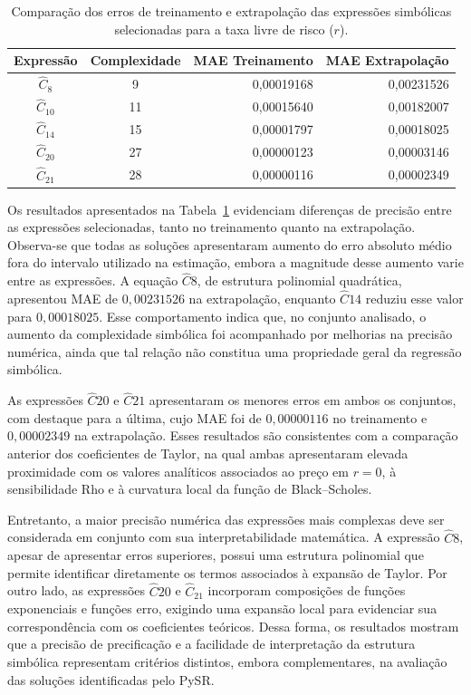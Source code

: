 \begin{table}[htbp]
\centering
\caption{Comparação dos erros de treinamento e extrapolação
das expressões simbólicas selecionadas para a taxa livre
de risco ($r$).}
\label{tab:r_metricas}
\small
\setlength{\tabcolsep}{10pt}
\renewcommand{\arraystretch}{1.2}

\begin{tabular}{c c r r}
\hline
\textbf{Expressão} &
\textbf{Complexidade} &
\textbf{MAE Treinamento} &
\textbf{MAE Extrapolação} \\
\hline

$\widehat{C}_8$  & 9  & 0,00019168 & 0,00231526 \\
$\widehat{C}_{10}$ & 11 & 0,00015640 & 0,00182007 \\
$\widehat{C}_{14}$ & 15 & 0,00001797 & 0,00018025 \\
$\widehat{C}_{20}$ & 27 & 0,00000123 & 0,00003146 \\
$\widehat{C}_{21}$ & 28 & 0,00000116 & 0,00002349 \\

\hline
\end{tabular}
\end{table}

Os resultados apresentados na Tabela~\ref{tab:r_metricas} evidenciam diferenças de precisão entre as expressões selecionadas, tanto no treinamento quanto na extrapolação. Observa-se que todas as soluções apresentaram aumento do erro absoluto médio fora do intervalo utilizado na estimação, embora a magnitude desse aumento varie entre as expressões. A equação $\widehat{C}8$, de estrutura polinomial quadrática, apresentou MAE de $0{,}00231526$ na extrapolação, enquanto $\widehat{C}{14}$ reduziu esse valor para $0{,}00018025$. Esse comportamento indica que, no conjunto analisado, o aumento da complexidade simbólica foi acompanhado por melhorias na precisão numérica, ainda que tal relação não constitua uma propriedade geral da regressão simbólica.

As expressões $\widehat{C}{20}$ e $\widehat{C}{21}$ apresentaram os menores erros em ambos os conjuntos, com destaque para a última, cujo MAE foi de $0{,}00000116$ no treinamento e $0{,}00002349$ na extrapolação. Esses resultados são consistentes com a comparação anterior dos coeficientes de Taylor, na qual ambas apresentaram elevada proximidade com os valores analíticos associados ao preço em $r=0$, à sensibilidade Rho e à curvatura local da função de Black--Scholes.

Entretanto, a maior precisão numérica das expressões mais complexas deve ser considerada em conjunto com sua interpretabilidade matemática. A expressão $\widehat{C}8$, apesar de apresentar erros superiores, possui uma estrutura polinomial que permite identificar diretamente os termos associados à expansão de Taylor. Por outro lado, as expressões $\widehat{C}{20}$ e $\widehat{C}_{21}$ incorporam composições de funções exponenciais e funções erro, exigindo uma expansão local para evidenciar sua correspondência com os coeficientes teóricos. Dessa forma, os resultados mostram que a precisão de precificação e a facilidade de interpretação da estrutura simbólica representam critérios distintos, embora complementares, na avaliação das soluções identificadas pelo PySR.


